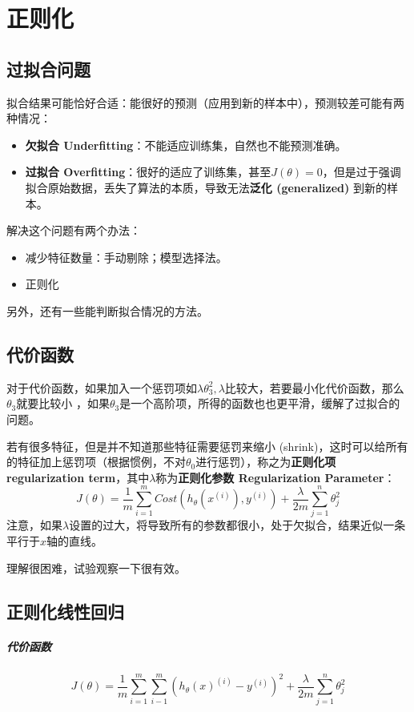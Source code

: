 \documentclass[../main.tex]{subfiles}
\begin{document}
\chapter{正则化}
\section{过拟合问题}
拟合结果可能恰好合适：能很好的预测（应用到新的样本中），预测较差可能有两种情况：
\begin{itemize}
    \item \textbf{欠拟合 Underfitting}：不能适应训练集，自然也不能预测准确。
    \item \textbf{过拟合 Overfitting}：很好的适应了训练集，甚至\(J(θ)=0\)，但是过于强调拟合原始数据，丢失了算法的本质，导致无法\textbf{泛化 (generalized) }到新的样本。
\end{itemize}

解决这个问题有两个办法：
\begin{itemize}
    \item 减少特征数量：手动剔除；模型选择法。
    \item 正则化
\end{itemize}
另外，还有一些能判断拟合情况的方法。

\section{代价函数}
对于代价函数，如果加入一个惩罚项如\(λθ_3^2, λ比较大\)，若要最小化代价函数，那么\(θ_3\)就要比较小 ，如果\(θ_3\)是一个高阶项，所得的函数也也更平滑，缓解了过拟合的问题。


若有很多特征，但是并不知道那些特征需要惩罚来缩小 (shrink)，这时可以给所有的特征加上惩罚项（根据惯例，不对\(θ_0\)进行惩罚），称之为\textbf{正则化项 regularization term}，其中\(λ\)称为\textbf{正则化参数 Regularization Parameter}：
\[
    J(θ)  = \frac{1}{m}\sum\limits_{i=1}^{m}Cost(h_θ(x^{(i)}), y^{(i)}) + \frac{λ}{2m}\sum\limits_{j=1}^{n}θ_j^2
\]
注意，如果\(λ\)设置的过大，将导致所有的参数都很小，处于欠拟合，结果近似一条平行于\(x\)轴的直线。\\
\begin{remark}
    理解很困难，试验观察一下很有效。
\end{remark}

\section{正则化线性回归}
\paragraph{代价函数}
\[
    J(θ)  = \frac{1}{m}\sum\limits_{i=1}^{m}\sum\limits_{i-1}^{m}(h_θ(x)^{(i)}-y^{(i)})^2 + \frac{λ}{2m}\sum\limits_{j=1}^{n}θ_j^2
\]
\end{document}
